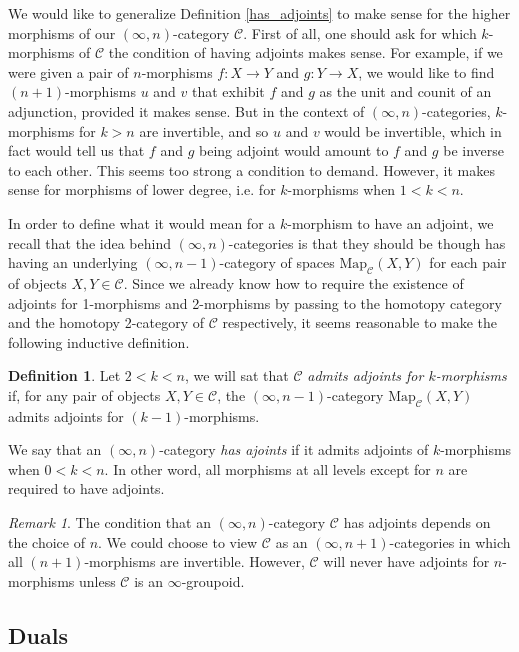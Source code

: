 \documentclass[a4paper,11pt]{article}
\newcommand{\ccal}{\mathcal{C}}
\theoremstyle{plain}
\theoremstyle{definition}
\newtheorem{defi}[thm]{Definition}
\theoremstyle{remark}
\newtheorem*{rem}{Remark}
\begin{document}
We would like to generalize Definition \ref{has_adjoints} to make sense for the higher morphisms of our $(\infty, n)$-category $\ccal$. First of all, one should ask for which $k$-morphisms of $\ccal$ the condition of having adjoints makes sense. For example, if we were given a pair of $n$-morphisms $f \colon X \to Y$ and $g \colon Y \to X$, we would like to find $(n+1)$-morphisms $u$ and $v$ that exhibit $f$ and $g$ as the unit and counit of an adjunction, provided it makes sense. But in the context of $(\infty, n)$-categories, $k$-morphisms for $k>n$ are invertible, and so $u$ and $v$ would be invertible, which in fact would tell us that $f$ and $g$ being adjoint would amount to $f$ and $g$ be inverse to each other. This seems too strong a condition to demand. However, it makes sense for morphisms of lower degree, i.e. for $k$-morphisms when $1 < k < n$. 

In order to define what it would mean for a $k$-morphism to have an adjoint, we recall that the idea behind $(\infty, n)$-categories is that they should be though has having an underlying $(\infty, n-1)$-category of spaces $\text{Map}_{\ccal}(X,Y)$ for each pair of objects $X, Y \in \ccal$. Since we already know how to require the existence of adjoints for 1-morphisms and 2-morphisms by passing to the homotopy category and the homotopy 2-category of $\ccal$ respectively, it seems reasonable to make the following inductive definition.


\begin{defi}
Let $2< k < n$, we will sat that $\ccal$ \textit{admits adjoints for $k$-morphisms} if, for any pair of objects $X, Y \in \ccal$, the $(\infty, n-1)$-category $\text{Map}_{\ccal}(X,Y)$ admits adjoints for $(k-1)$-morphisms. 

We say that an $(\infty, n)$-category \textit{has ajoints} if it admits adjoints of $k$-morphisms when $0<k<n$. In other word, all morphisms at all levels except for $n$ are required to have adjoints.
\end{defi}

\begin{rem}
The condition that an $(\infty, n)$-category $\ccal$ has adjoints depends on the choice of $n$. We could choose to view $\ccal$ as an $(\infty, n+1)$-categories in which all $(n+1)$-morphisms are invertible. However, $\ccal$ will never have adjoints for $n$-morphisms unless $\ccal$ is an $\infty$-groupoid. 
\end{rem}


\subsection{Duals}
\end{document}
